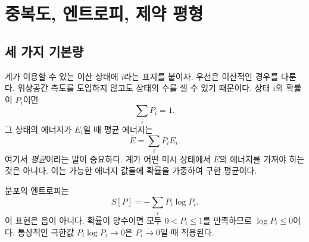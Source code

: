 \chapter{중복도, 엔트로피, 제약 평형}


\section{세 가지 기본량}

계가 이용할 수 있는 이산 상태에 \(i\)라는 표지를 붙이자. 우선은 이산적인 경우를 다룬다. 위상공간 측도를 도입하지 않고도 상태의 수를 셀 수 있기 때문이다. 상태 \(i\)의 확률이 \(P_i\)이면 \begin{equation}
 \sum_i P_i=1.
 \label{eq:sm3-normalization}
\end{equation}그 상태의 에너지가 \(E_i\)일 때 평균 에너지는 \begin{equation}
 \overline E=\sum_iP_iE_i.
 \label{eq:sm3-mean-energy}
\end{equation}여기서 \emph{평균}이라는 말이 중요하다. 계가 어떤 미시 상태에서 \(\overline E\)의 에너지를 가져야 하는 것은 아니다. 이는 가능한 에너지 값들에 확률을 가중하여 구한 평균이다.

\begin{classroomqa}\end{classroomqa}

분포의 엔트로피는
\begin{equation}
 S[P]=-\sum_iP_i\log P_i.
 \label{eq:sm3-entropy}
\end{equation}
이 표현은 음이 아니다. 확률이 양수이면 모두
\(0<P_i\leq1\)를 만족하므로 \(\log P_i\leq0\)이다. 통상적인 극한값 \(P_i\log P_i\to0\)은 \(P_i\to0\)일 때 적용된다.

